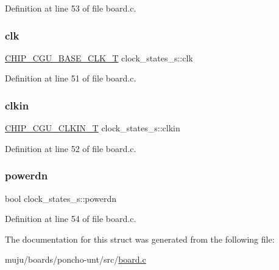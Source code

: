 Definition at line 53 of file board.\+c.

\mbox{\label{structclock__states__s_a7727daab54f625acad2297c9ec8eb0da}} 
\subsubsection{\texorpdfstring{clk}{clk}}
{\footnotesize\ttfamily \hyperlink{chip__clocks_8h_a31e266dd83cc66eb866d8d051ffd1d45}{C\+H\+I\+P\+\_\+\+C\+G\+U\+\_\+\+B\+A\+S\+E\+\_\+\+C\+L\+K\+\_\+T} clock\+\_\+states\+\_\+s\+::clk}



Definition at line 51 of file board.\+c.

\mbox{\label{structclock__states__s_ae8fddb27bac6effab31d3370af6b9579}} 
\subsubsection{\texorpdfstring{clkin}{clkin}}
{\footnotesize\ttfamily \hyperlink{group___c_l_o_c_k__18_x_x__43_x_x_ga0975326707efebf2b074283e6c602f18}{C\+H\+I\+P\+\_\+\+C\+G\+U\+\_\+\+C\+L\+K\+I\+N\+\_\+T} clock\+\_\+states\+\_\+s\+::clkin}



Definition at line 52 of file board.\+c.

\mbox{\label{structclock__states__s_a2030220aeab3bffa2b86c8b5d27773c3}} 
\subsubsection{\texorpdfstring{powerdn}{powerdn}}
{\footnotesize\ttfamily bool clock\+\_\+states\+\_\+s\+::powerdn}



Definition at line 54 of file board.\+c.



The documentation for this struct was generated from the following file\+:\begin{DoxyCompactItemize}
\item 
muju/boards/poncho-\/unt/src/\hyperlink{poncho-unt_2src_2board_8c}{board.\+c}\end{DoxyCompactItemize}
